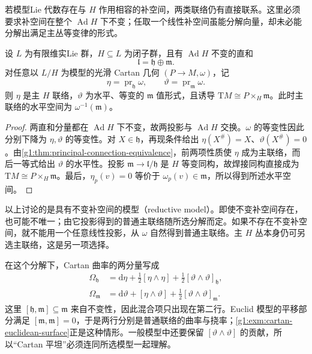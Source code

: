 若模型Lie 代数存在与 \(H\) 作用相容的补空间，两类联络仍有直接联系。这里必须要求补空间在整个 \(\operatorname{Ad}H\) 下不变；任取一个线性补空间虽能分解向量，却未必能分解出满足主丛等变律的形式。

\begin{proposition}\label{g1:prop:reductive-cartan-splitting}
	设 \(L\) 为有限维实Lie 群，\(H\subseteq L\) 为闭子群，且有 \(\operatorname{Ad}H\) 不变的直和
	\[
		\mathfrak l=\mathfrak h\oplus\mathfrak m.
	\]
	对任意以 \(L/H\) 为模型的光滑 Cartan 几何 \((P\to M,\omega)\)，记
	\[
		\eta=\operatorname{pr}_{\mathfrak h}\omega,\qquad
		\vartheta=\operatorname{pr}_{\mathfrak m}\omega.
	\]
	则 \(\eta\) 是主 \(H\) 联络，\(\vartheta\) 为水平、等变的 \(\mathfrak m\) 值形式，且诱导 \(\mathrm{T}M\cong P\times_H\mathfrak m\)。此时主联络的水平空间为 \(\omega^{-1}(\mathfrak m)\)。
\end{proposition}
\begin{proof}
	两直和分量都在 \(\operatorname{Ad}H\) 下不变，故两投影与 \(\operatorname{Ad}H\) 交换。\(\omega\) 的等变性因此分别下降为 \(\eta,\vartheta\) 的等变性。对 \(X\in\mathfrak h\)，再现条件给出 \(\eta(X^\#)=X\)、\(\vartheta(X^\#)=0\)。由\cref{g1:thm:principal-connection-equivalence}，前两项性质使 \(\eta\) 成为主联络，而后一等式给出 \(\vartheta\) 的水平性。投影 \(\mathfrak m\to\mathfrak l/\mathfrak h\) 是 \(H\) 等变同构，故焊接同构直接成为 \(\mathrm{T}M\cong P\times_H\mathfrak m\)。最后，\(\eta_p(v)=0\) 等价于 \(\omega_p(v)\in\mathfrak m\)，所以得到所述水平空间。
\end{proof}

以上讨论的是具有不变补空间的模型（reductive model）。即使不变补空间存在，也可能不唯一；由它投影得到的普通主联络随所选分解而定。如果不存在不变补空间，就不能用一个任意线性投影，从 \(\omega\) 自然得到普通主联络。主 \(H\) 丛本身仍可另选主联络，这是另一项选择。

\ProseParagraphBreak

在这个分解下，Cartan 曲率的两分量写成
\[
	\begin{aligned}
		\Omega_{\mathfrak h}
		&=\mathrm{d}\eta+\tfrac12[\eta\wedge\eta]
		+\tfrac12[\vartheta\wedge\vartheta]_{\mathfrak h},\\
		\Omega_{\mathfrak m}
		&=\mathrm{d}\vartheta+[\eta\wedge\vartheta]
		+\tfrac12[\vartheta\wedge\vartheta]_{\mathfrak m}.
	\end{aligned}
\]
这里 \([\mathfrak h,\mathfrak m]\subseteq\mathfrak m\) 来自不变性，因此混合项只出现在第二行。Euclid 模型的平移部分满足 \([\mathfrak m,\mathfrak m]=0\)，于是两行分别是普通联络的曲率与挠率；\cref{g1:exm:cartan-euclidean-surface}正是这种情形。一般模型中还要保留 \([\vartheta\wedge\vartheta]\) 的贡献，所以“Cartan 平坦”必须连同所选模型一起理解。

